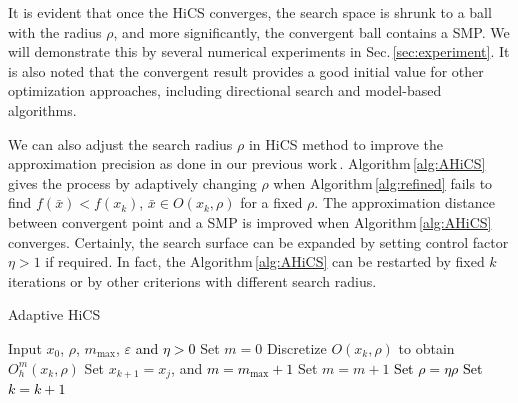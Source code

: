 \documentclass[final,1p,times]{elsarticle}
\begin{document}
It is evident that once the HiCS converges,
the search space is shrunk to a ball with the radius $\rho$, and
more significantly, the convergent ball contains a SMP.
We will demonstrate this by several numerical experiments in
Sec.\,\ref{sec:experiment}.
It is also noted that the convergent result provides a
good initial value for other optimization approaches, including 
directional search and model-based algorithms.

We can also adjust the search radius $\rho$ in HiCS method 
to improve the approximation precision as done in our previous
work\,\cite{huang2017hill}. Algorithm\,\ref{alg:AHiCS} gives the
process by adaptively changing $\rho$ when Algorithm\,\ref{alg:refined} fails
to find $f(\bar{x})<f(x_k)$, $\bar{x}\in O(x_k, \rho)$ for a fixed $\rho$.
The approximation distance between convergent point and a SMP is
improved when Algorithm\,\ref{alg:AHiCS} converges.
Certainly, the search surface can be expanded by setting
control factor $\eta>1$ if required. 
In fact, the Algorithm\,\ref{alg:AHiCS} can be restarted by
fixed $k$ iterations or by other criterions
with different search radius.

%
%
\begin{algorithm}[H]
	\caption{Adaptive HiCS}
	\label{alg:AHiCS}
\begin{algorithmic}[1]
	\STATE Input $x_0$, $\rho$, $m_{\max}$,
	\textcolor{black}{$\varepsilon$ and $\eta>0$}
	\IF { \textcolor{black}{ $\rho>\varepsilon$}}
		\STATE Set $m=0$
			\STATE Discretize $O(x_k,\rho)$ to obtain $O^m_h(x_k,\rho)$
			\STATE Set $x_{k+1}=x_j$, 
				and \textcolor{black}{$m=m_{\max}+1$} 
			\ELSE
				\STATE Set $m = m+1$
			\ENDIF
		\ELSE
			\STATE \textcolor{black}{ Set $\rho=\eta\rho$}
		\ENDIF
		\STATE \textcolor{black}{Set $k=k+1$}
	\ENDFOR
\ENDIF
\end{algorithmic}
\end{algorithm}
\end{document}
